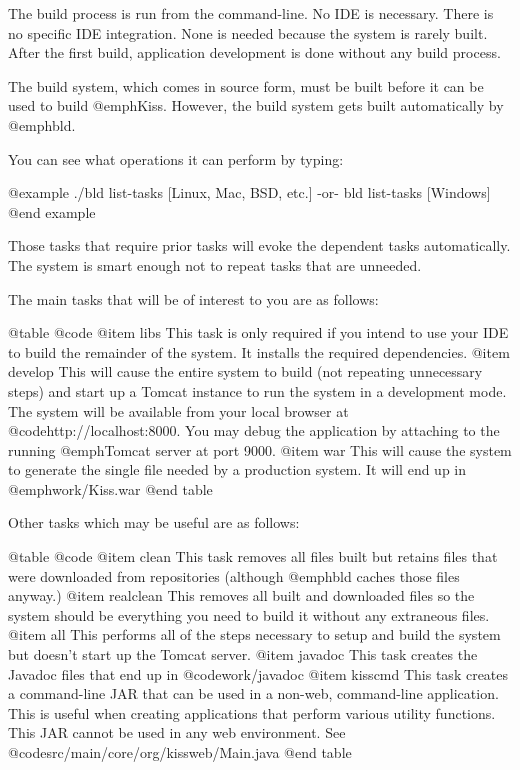 The build process is run from the command-line.  No IDE is necessary.
There is no specific IDE integration.  None is needed because the system
is rarely built.  After the first build, application development is done
without any build process.

The build system, which comes in source form, must be built before it
can be used to build @emph{Kiss}.  However, the build system gets built
automatically by @emph{bld}.

You can see what operations it can perform by typing:

@example
    ./bld list-tasks           [Linux, Mac, BSD, etc.]
        -or-
    bld list-tasks             [Windows]
@end example

Those tasks that require prior tasks will evoke the dependent tasks
automatically.  The system is smart enough not to repeat tasks that
are unneeded.

The main tasks that will be of interest to you are as follows:

@table @code
@item libs
This task is only required if you intend to use your IDE to build the
remainder of the system.  It installs the required dependencies.
@item develop
This will cause the entire system to build (not repeating unnecessary
steps) and start up a Tomcat instance to run the system in a
development mode.  The system will be available from your local
browser at @code{http://localhost:8000}.  You may debug the
application by attaching to the running @emph{Tomcat} server at port
9000.
@item war
This will cause the system to generate the single file needed by a
production system.  It will end up in @emph{work/Kiss.war}
@end table

Other tasks which may be useful are as follows:

@table @code
@item clean
This task removes all files built but retains files that were downloaded from
repositories (although @emph{bld} caches those files anyway.)
@item realclean
This removes all built and downloaded files so the system should be everything
you need to build it without any extraneous files.
@item all
This performs all of the steps necessary to setup and build the system but
doesn't start up the Tomcat server.
@item javadoc
This task creates the Javadoc files that end up in @code{work/javadoc}
@item kisscmd
This task creates a command-line JAR that can be used in a non-web, command-line application.
This is useful when creating applications that perform various utility functions.  This
JAR cannot be used in any web environment.  See @code{src/main/core/org/kissweb/Main.java}
@end table

